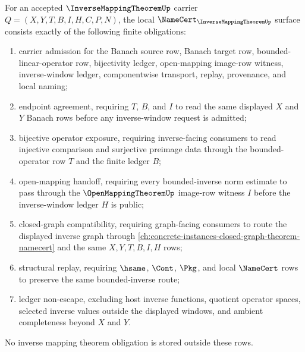 \begin{theorem}
\label{thm:inverse-mapping-theorem-namecert-obligations}
For an accepted $\InverseMappingTheoremUp$ carrier $Q=(X,Y,T,B,I,H,C,P,N)$, the local $\NameCert_{\InverseMappingTheoremUp}$ surface consists exactly of the following finite obligations:
\begin{enumerate}
\item carrier admission for the Banach source row, Banach target row, bounded-linear-operator row, bijectivity ledger, open-mapping image-row witness, inverse-window ledger, componentwise transport, replay, provenance, and local naming;
\item endpoint agreement, requiring $T$, $B$, and $I$ to read the same displayed $X$ and $Y$ Banach rows before any inverse-window request is admitted;
\item bijective operator exposure, requiring inverse-facing consumers to read injective comparison and surjective preimage data through the bounded-operator row $T$ and the finite ledger $B$;
\item open-mapping handoff, requiring every bounded-inverse norm estimate to pass through the $\OpenMappingTheoremUp$ image-row witness $I$ before the inverse-window ledger $H$ is public;
\item closed-graph compatibility, requiring graph-facing consumers to route the displayed inverse graph through \autoref{ch:concrete-instances-closed-graph-theorem-namecert} and the same $X,Y,T,B,I,H$ rows;
\item structural replay, requiring $\hsame$, $\Cont$, $\Pkg$, and local $\NameCert$ rows to preserve the same bounded-inverse route;
\item ledger non-escape, excluding host inverse functions, quotient operator spaces, selected inverse values outside the displayed windows, and ambient completeness beyond $X$ and $Y$.
\end{enumerate}
No inverse mapping theorem obligation is stored outside these rows.
\end{theorem}
